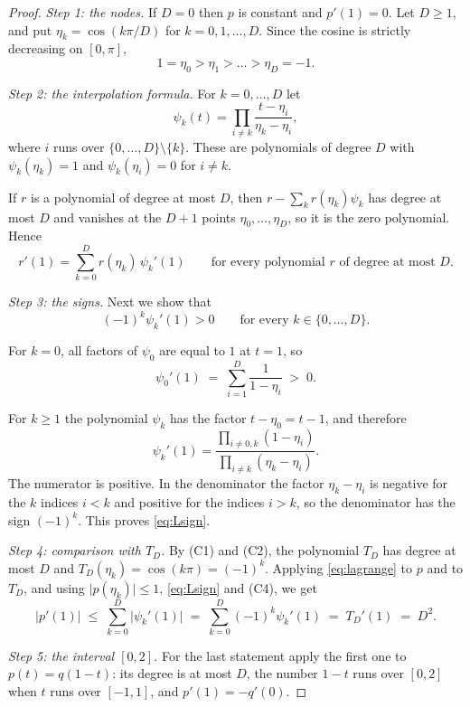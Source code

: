 \documentclass[11pt,reqno]{amsart}
\theoremstyle{definition}
\theoremstyle{remark}
\numberwithin{equation}{section}
\theoremstyle{named}
\theoremstyle{plain}
\newcommand{\abs}[1]{\lvert #1\rvert}
\begin{document}
\begin{proof}
\emph{Step 1: the nodes.} If $D=0$ then $p$ is constant and $p'(1)=0$. Let $D\ge1$, and put
$\eta_k=\cos(k\pi/D)$ for
$k=0,1,\dots,D$. Since the cosine is strictly decreasing on $[0,\pi]$,
\[
   1=\eta_0>\eta_1>\dots>\eta_D=-1 .
\]

\smallskip
\emph{Step 2: the interpolation formula.} For $k=0,\dots,D$ let
\[
   \psi_k(t)=\prod_{i\ne k}\frac{t-\eta_i}{\eta_k-\eta_i},
\]
where $i$ runs over $\{0,\dots,D\}\setminus\{k\}$. These are polynomials of degree $D$ with
$\psi_k(\eta_k)=1$ and $\psi_k(\eta_i)=0$ for $i\ne k$.

If $r$ is a polynomial of degree at most $D$, then
$r-\sum_kr(\eta_k)\psi_k$ has degree at most $D$ and vanishes at the $D+1$ points $\eta_0,\dots,\eta_D$,
so it is the zero polynomial. Hence
\begin{equation}\label{eq:lagrange}
   r'(1)=\sum_{k=0}^{D}r(\eta_k)\,\psi_k'(1)\qquad\text{for every polynomial $r$ of degree at most $D$.}
\end{equation}

\smallskip
\emph{Step 3: the signs.} Next we show that
\begin{equation}\label{eq:Lsign}
   (-1)^{k}\psi_k'(1)>0\qquad\text{for every }k\in\{0,\dots,D\}.
\end{equation}

For $k=0$, all factors of $\psi_0$ are equal to $1$ at
$t=1$, so
\[
   \psi_0'(1)\;=\;\sum_{i=1}^{D}\frac1{1-\eta_i}\;>\;0 .
\]

For $k\ge1$ the polynomial $\psi_k$ has the factor
$t-\eta_0=t-1$, and therefore
\[
   \psi_k'(1)=\frac{\prod_{i\ne0,k}(1-\eta_i)}{\prod_{i\ne k}(\eta_k-\eta_i)} .
\]
The numerator is positive. In the denominator the factor $\eta_k-\eta_i$ is negative for the $k$
indices $i<k$ and positive for the indices $i>k$, so the denominator has the sign $(-1)^{k}$. This
proves \eqref{eq:Lsign}.

\smallskip
\emph{Step 4: comparison with $T_D$.} By (C1) and (C2), the polynomial $T_D$ has degree at most
$D$ and
$T_D(\eta_k)=\cos(k\pi)=(-1)^{k}$. Applying \eqref{eq:lagrange} to $p$ and to $T_D$, and using
$\abs{p(\eta_k)}\le1$, \eqref{eq:Lsign} and (C4), we get
\[
   \abs{p'(1)}\;\le\;\sum_{k=0}^{D}\abs{\psi_k'(1)}\;=\;\sum_{k=0}^{D}(-1)^{k}\psi_k'(1)\;=\;T_D'(1)\;=\;D^{2}.
\]

\smallskip
\emph{Step 5: the interval $[0,2]$.} For the last statement apply the first one to $p(t)=q(1-t)$:
its degree is at most $D$, the number
$1-t$ runs over $[0,2]$ when $t$ runs over $[-1,1]$, and $p'(1)=-q'(0)$.
\end{proof}
\end{document}

